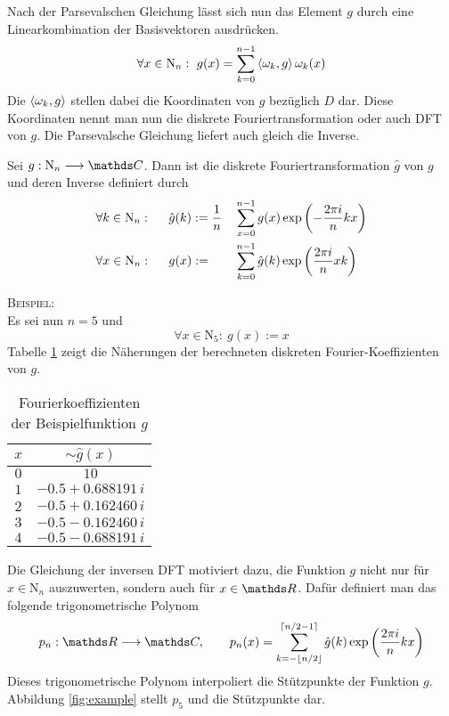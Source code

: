 			Nach der Parsevalschen Gleichung lässt sich nun das Element $g$ durch eine Linearkombination der Basisvektoren ausdrücken.
			\[ \forall x\in\mathrm{N}_n: \ g(x) = \sum_{k=0}^{n-1} \left\langle \omega_k, g \right\rangle \omega_k(x) \]
			Die $\left\langle \omega_k, g \right\rangle$ stellen dabei die Koordinaten von $g$ bezüglich $D$ dar.
			Diese Koordinaten nennt man nun die diskrete Fouriertransformation oder auch DFT von $g$.
			Die Parsevalsche Gleichung liefert auch gleich die Inverse.

			\begin{definition*}
				Sei $g:\mathrm{N}_n\longrightarrow\SC$. 
				Dann ist die diskrete Fouriertransformation $\hat{g}$ von $g$ und deren Inverse definiert durch
				\begin{alignat*}{4}
					&\forall k\in\mathrm{N}_n: \ &&\ \hat{g}(k) := \frac{1}{n} &&\sum_{x=0}^{n-1} g(x)\exp\curvb{ -\frac{2\pi i}{n}kx } \\
					&\forall x\in\mathrm{N}_n: \ &&\ g(x) := &&\sum_{k=0}^{n-1} \hat{g}(k)\exp\curvb{ \frac{2\pi i}{n}xk }
				\end{alignat*}
			\end{definition*}

			\textsc{Beispiel:}\\
			Es sei nun $n=5$ und
			\[ \forall x\in\mathrm{N}_5: \ g(x):=x \]
			Tabelle \ref{tab:example} zeigt die Näherungen der berechneten diskreten Fourier-Koeffizienten von $g$.

			\begin{table}[h]
				\center
				\setlength{\extrarowheight}{4pt}
				\begin{tabular}{c|c}
					\hline
					$x$ & $\sim\hat{g}(x)$ \\ [1ex]
					\hline
					\hline
					$0$ & $10$ \\
					$1$ & $-0.5 + 0.688191\,i$ \\
					$2$ & $-0.5 + 0.162460\,i$ \\
					$3$ & $-0.5 - 0.162460\,i$ \\
					$4$ & $-0.5 - 0.688191\,i$ \\
					\hline
				\end{tabular}
				\caption{Fourierkoeffizienten der Beispielfunktion $g$}
				\label{tab:example}
			\end{table}

			Die Gleichung der inversen DFT motiviert dazu, die Funktion $g$ nicht nur für $x\in\mathrm{N}_n$ auszuwerten, sondern auch für $x\in\SR$.
			Dafür definiert man das folgende trigonometrische Polynom
			\[ p_n:\SR\longrightarrow\SC,\qquad p_n(x) = \sum_{k=-\floorb{n/2}}^{\ceilb{n/2 - 1}} \hat{g}(k) \exp\curvb{ \frac{2\pi i}{n}kx } \]
			Dieses trigonometrische Polynom interpoliert die Stützpunkte der Funktion $g$.
			Abbildung \ref{fig:example} stellt $p_5$ und die Stützpunkte dar.

